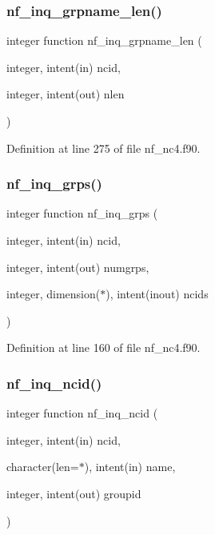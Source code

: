 \subsubsection{\texorpdfstring{nf\+\_\+inq\+\_\+grpname\+\_\+len()}{nf\_inq\_grpname\_len()}}
{\footnotesize\ttfamily integer function nf\+\_\+inq\+\_\+grpname\+\_\+len (\begin{DoxyParamCaption}\item[{integer, intent(in)}]{ncid,  }\item[{integer, intent(out)}]{nlen }\end{DoxyParamCaption})}



Definition at line 275 of file nf\+\_\+nc4.\+f90.

\mbox{\label{nf__nc4_8f90_a96bc3dc03724b5b56b66c007d718e469}} 
\subsubsection{\texorpdfstring{nf\+\_\+inq\+\_\+grps()}{nf\_inq\_grps()}}
{\footnotesize\ttfamily integer function nf\+\_\+inq\+\_\+grps (\begin{DoxyParamCaption}\item[{integer, intent(in)}]{ncid,  }\item[{integer, intent(out)}]{numgrps,  }\item[{integer, dimension($\ast$), intent(inout)}]{ncids }\end{DoxyParamCaption})}



Definition at line 160 of file nf\+\_\+nc4.\+f90.

\mbox{\label{nf__nc4_8f90_aca28d2a726e7981618924ea21d03d8df}} 
\subsubsection{\texorpdfstring{nf\+\_\+inq\+\_\+ncid()}{nf\_inq\_ncid()}}
{\footnotesize\ttfamily integer function nf\+\_\+inq\+\_\+ncid (\begin{DoxyParamCaption}\item[{integer, intent(in)}]{ncid,  }\item[{character(len=$\ast$), intent(in)}]{name,  }\item[{integer, intent(out)}]{groupid }\end{DoxyParamCaption})}



